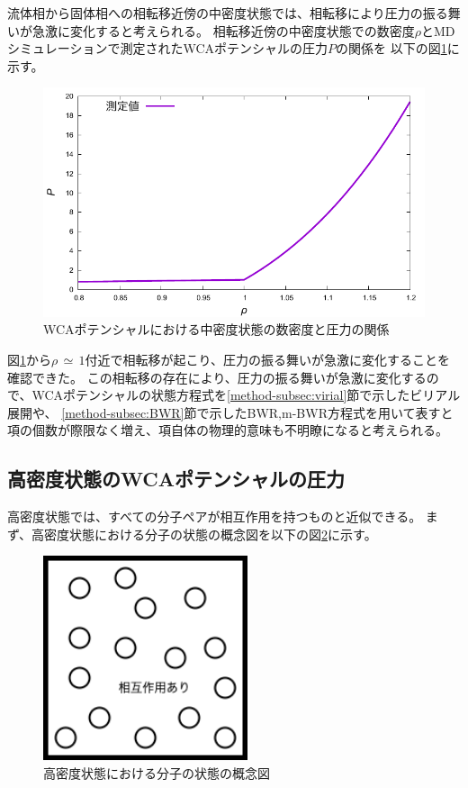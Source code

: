 \documentclass[titlepage]{jsreport}
\begin{document}
{{{\newpage
流体相から固体相への相転移近傍の中密度状態では、相転移により圧力の振る舞いが急激に変化すると考えられる。
相転移近傍の中密度状態での数密度$\rho$とMDシミュレーションで測定されたWCAポテンシャルの圧力$P$の関係を
以下の図\ref{fig:middleden_den-pre}に示す。

\begin{figure}[htbp]
    \begin{center}
        \includegraphics[width=14cm]{fig/middleden_den-pre.pdf}
    \end{center}
    \caption{WCAポテンシャルにおける中密度状態の数密度と圧力の関係}
    \label{fig:middleden_den-pre}
\end{figure}


図\ref{fig:middleden_den-pre}から$\rho\,{\simeq}\,1$付近で相転移が起こり、圧力の振る舞いが急激に変化することを確認できた。
この相転移の存在により、圧力の振る舞いが急激に変化するので、WCAポテンシャルの状態方程式を\ref{method-subsec:virial}節で示したビリアル展開や、
\ref{method-subsec:BWR}節で示したBWR,m-BWR方程式を用いて表すと項の個数が際限なく増え、項自体の物理的意味も不明瞭になると考えられる。


\subsection{高密度状態のWCAポテンシャルの圧力}\label{results-subsec:WCA-press-high-density}
高密度状態では、すべての分子ペアが相互作用を持つものと近似できる。
まず、高密度状態における分子の状態の概念図を以下の図\ref{fig:highdensity.png}に示す。

\begin{figure}[htbp]
    \begin{center}
        \includegraphics[width=6cm]{fig/highdensity.png}
    \end{center}
    \caption{高密度状態における分子の状態の概念図}
    \label{fig:highdensity.png}
\end{figure}

}}}
\end{document}
